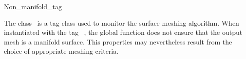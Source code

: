 

\begin{ccRefClass}{Non_manifold_tag}  %


\ccDefinition
  
The class \ccRefName\ is a tag class used to monitor the
surface meshing algorithm. When instantiated with the tag
\ccRefName\ , the global function 
does not ensure that the output mesh  is a  manifold surface.
This properties may nevertheless result from the choice of
appropriate meshing criteria.











\ccSeeAlso

\\
 \\
 \\




\end{ccRefClass}


